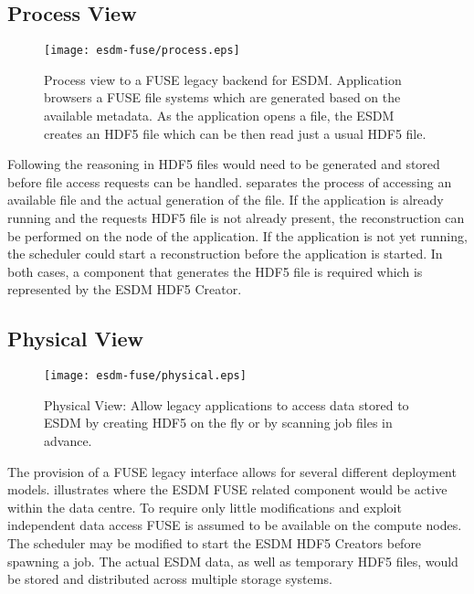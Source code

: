 \subsection{Process View}


\begin{figure}
	\centering
	\texttt{[image: esdm-fuse/process.eps]}
	\caption{Process view to a FUSE legacy backend for ESDM. Application browsers a FUSE file systems which are generated based on the available metadata. As the application opens a file, the ESDM creates an HDF5 file which can be then read just a usual HDF5 file.}
	\label{fig:esdm fuse process view}
\end{figure}

Following the reasoning in  HDF5 files would need to be generated and stored before file access requests can be handled.
 separates the process of accessing an available file and the actual generation of the file.
If the application is already running and the requests HDF5 file is not already present, the reconstruction can be performed on the node of the application.
If the application is not yet running, the scheduler could start a reconstruction before the application is started.
In both cases, a component that generates the HDF5 file is required which is represented by the ESDM HDF5 Creator.







\subsection{Physical View}

\begin{figure}
	\centering
	\texttt{[image: esdm-fuse/physical.eps]}
	\caption{Physical View: Allow legacy applications to access data stored to ESDM by creating HDF5 on the fly or by scanning job files in advance.}
	\label{fig:esdm fuse physical view}
\end{figure}

The provision of a FUSE legacy interface allows for several different deployment models.
 illustrates where the ESDM FUSE related component would be active within the data centre.
To require only little modifications and exploit independent data access FUSE is assumed to be available on the compute nodes.
The scheduler may be modified to start the ESDM HDF5 Creators before spawning a job.
The actual ESDM data, as well as temporary HDF5 files, would be stored and distributed across multiple storage systems.
